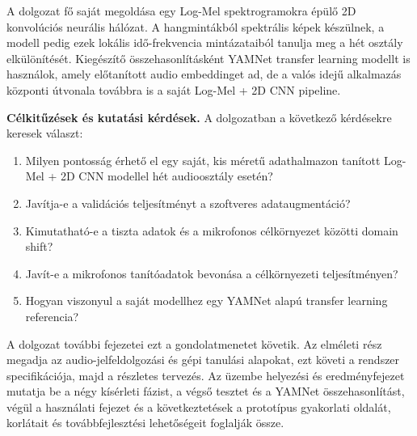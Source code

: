 A dolgozat fő saját megoldása egy Log-Mel spektrogramokra épülő 2D konvolúciós
neurális hálózat. A hangmintákból spektrális képek készülnek, a modell pedig ezek
lokális idő-frekvencia mintázataiból tanulja meg a hét osztály elkülönítését.
Kiegészítő összehasonlításként YAMNet transfer learning modellt is használok,
amely előtanított audio embeddinget ad, de a valós idejű alkalmazás központi
útvonala továbbra is a saját Log-Mel + 2D CNN pipeline.

\textbf{Célkitűzések és kutatási kérdések.} A dolgozatban a következő kérdésekre
keresek választ:
\begin{enumerate}
    \item Milyen pontosság érhető el egy saját, kis méretű adathalmazon tanított
    Log-Mel + 2D CNN modellel hét audioosztály esetén?
    \item Javítja-e a validációs teljesítményt a szoftveres adataugmentáció?
    \item Kimutatható-e a tiszta adatok és a mikrofonos célkörnyezet közötti
    domain shift?
    \item Javít-e a mikrofonos tanítóadatok bevonása a célkörnyezeti
    teljesítményen?
    \item Hogyan viszonyul a saját modellhez egy YAMNet alapú transfer learning
    referencia?
\end{enumerate}

A dolgozat további fejezetei ezt a gondolatmenetet követik. Az elméleti rész
megadja az audio-jelfeldolgozási és gépi tanulási alapokat, ezt követi a rendszer
specifikációja, majd a részletes tervezés. Az üzembe helyezési és eredményfejezet
mutatja be a négy kísérleti fázist, a végső tesztet és a YAMNet összehasonlítást,
végül a használati fejezet és a következtetések a prototípus gyakorlati oldalát,
korlátait és továbbfejlesztési lehetőségeit foglalják össze.
